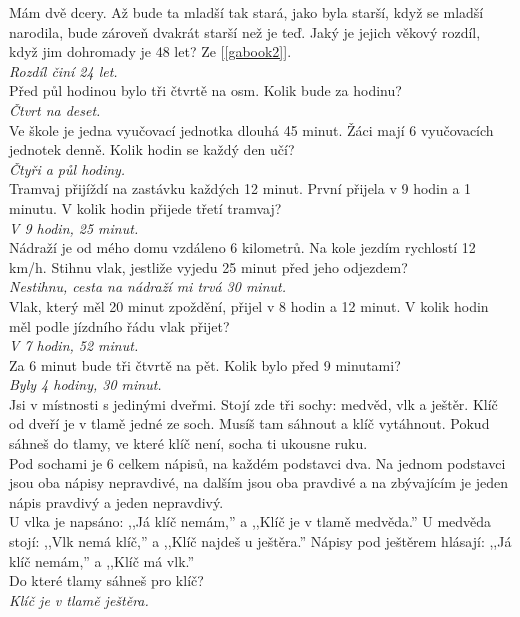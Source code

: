 \begin{multicols}{\value{columnsgames}}
\noindent
Mám dvě dcery. Až bude ta mladší tak stará, jako byla starší, když se mladší
narodila, bude zároveň dvakrát starší než je teď. Jaký je jejich věkový
rozdíl, když jim dohromady je 48 let? Ze [\ref{gabook2}].\\[1 mm]
{\sl Rozdíl činí 24 let.}\\

\noindent
Před půl hodinou bylo tři čtvrtě na osm. Kolik bude za hodinu?\\[1 mm]
{\sl Čtvrt na deset.}\\

\noindent
Ve škole je jedna vyučovací jednotka dlouhá 45 minut. Žáci mají 6 vyučovacích
jednotek denně. Kolik hodin se každý den učí?\\[1 mm]
{\sl Čtyři a půl hodiny.}\\

\noindent
Tramvaj přijíždí na zastávku každých 12 minut. První přijela v 9 hodin a 1
minutu. V kolik hodin přijede třetí tramvaj?\\[1 mm]
{\sl V 9 hodin, 25 minut.}\\

\noindent
Nádraží je od mého domu vzdáleno 6 kilometrů. Na kole jezdím rychlostí
12 km/h. Stihnu vlak, jestliže vyjedu 25 minut před jeho odjezdem?\\[1 mm]
{\sl Nestihnu, cesta na nádraží mi trvá 30 minut.}\\

\noindent
Vlak, který měl 20 minut zpoždění, přijel v 8 hodin a 12 minut. V kolik
hodin měl podle jízdního řádu vlak přijet?\\[1 mm]
{\sl V 7 hodin, 52 minut.}\\

\noindent
Za 6 minut bude tři čtvrtě na pět. Kolik bylo před 9 minutami?\\[1 mm]
{\sl Byly 4 hodiny, 30 minut.}\\

\noindent
Jsi v místnosti s jedinými dveřmi. Stojí zde tři sochy: medvěd, vlk
a ještěr. Klíč od dveří je v tlamě jedné ze soch. Musíš tam sáhnout a
klíč vytáhnout. Pokud sáhneš do tlamy, ve které klíč není, socha ti
ukousne ruku.\\
Pod sochami je 6 celkem nápisů, na každém podstavci dva. Na jednom
podstavci jsou oba nápisy nepravdivé, na dalším jsou oba pravdivé a na
zbývajícím je jeden nápis pravdivý a jeden nepravdivý.\\
U vlka je napsáno: ,,Já klíč nemám,'' a ,,Klíč je v tlamě medvěda.'' U
medvěda stojí: ,,Vlk nemá klíč,'' a ,,Klíč najdeš u ještěra.'' Nápisy pod
ještěrem hlásají: ,,Já klíč nemám,'' a ,,Klíč má vlk.''\\
Do které tlamy sáhneš pro klíč?\\[1 mm]
{\sl Klíč je v tlamě ještěra.}\\


\end{multicols}
